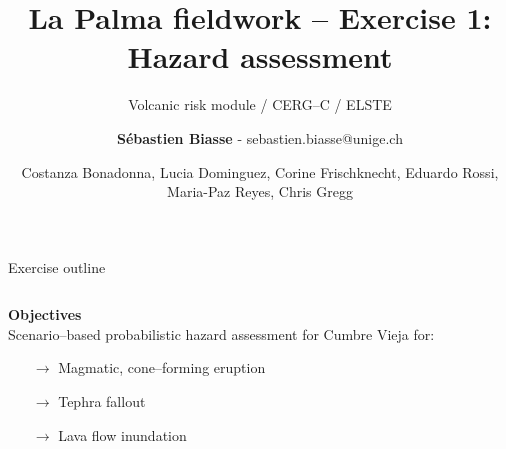 \documentclass[10pt,aspectratio=169]{beamer}
\title{La Palma fieldwork -- Exercise 1: Hazard assessment}
\subtitle{\normalsize Volcanic risk module / CERG--C / ELSTE}
\date{\vspace*{.5em} \footnotesize Costanza Bonadonna, Lucia Dominguez, Corine Frischknecht, Eduardo Rossi, Maria-Paz Reyes, Chris Gregg}
\author{\textbf{Sébastien Biasse} - sebastien.biasse@unige.ch}
\institute{16 May 2022}
\begin{document}
\maketitle 

\begin{frame}[t]{Exercise outline}
    \begin{columns}[T]
        \begin{column}{0.5\textwidth}	
            \textbf{Objectives} \\ \vspace*{1em} 
            \alert{Scenario--based} probabilistic hazard assessment for Cumbre Vieja for:
            \begin{itemize}
                \item[$\rightarrow$] \alert{Magmatic}, \alert{cone--forming} eruption
                \item[$\rightarrow$] \alert{Tephra fallout}
                \item[$\rightarrow$] \alert{Lava flow inundation}
            \end{itemize}

        \end{column}
  

\end{columns}
\end{frame}
\end{document}
